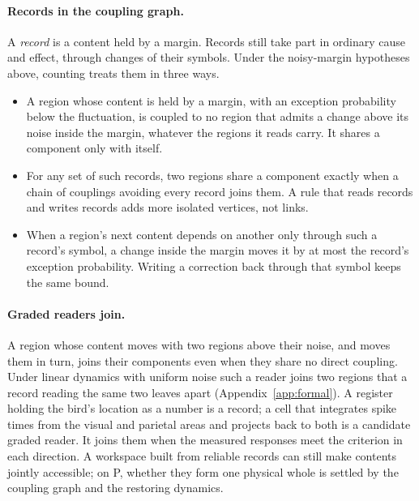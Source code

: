 \documentclass[12pt]{article}
\begin{document}
\paragraph{Records in the coupling graph.} A \emph{record} is a content held by
a margin. Records still take part in ordinary cause and effect, through changes
of their symbols. Under the noisy-margin hypotheses above, counting treats them
in three ways.
\begin{itemize}
\item A region whose content is held by a margin, with an exception probability
below the fluctuation, is coupled to no region that admits a change above its
noise inside the margin, whatever the regions it reads carry. It shares a
component only with itself.
\item For any set of such records, two regions share a component exactly when
a chain of couplings avoiding every record joins them. A rule that reads
records and writes records adds more isolated vertices, not links.
\item When a region's next content depends on another only through such a
record's symbol, a change inside the margin moves it by at most the record's
exception probability. Writing a correction back through that symbol keeps the
same bound.
\end{itemize}

\paragraph{Graded readers join.} A region whose content moves with two regions
above their noise, and moves them in turn, joins their components even when
they share no direct coupling. Under linear dynamics with uniform noise such a
reader joins two regions that a record reading the same two leaves apart
(Appendix~\ref{app:formal}). A register holding the bird's location as a number
is a record; a cell that integrates spike times from the visual and parietal
areas and projects back to both is a candidate graded reader. It joins them
when the measured responses meet the criterion in each direction. A workspace
built from reliable records can still make contents jointly accessible; on P,
whether they form one physical whole is settled by the coupling graph and the
restoring dynamics.
\end{document}
